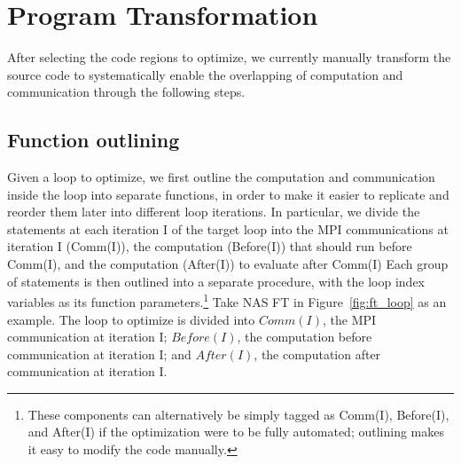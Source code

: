 \section{Program Transformation}
\label{sec-opt}

After selecting the code regions to optimize,
  we currently manually transform the source code to systematically
 enable the overlapping of computation and communication
through the following steps.

\subsection{Function outlining}
Given a loop to optimize, we
first outline the computation and communication inside the loop into separate functions,
in order to make it easier to replicate and reorder them later into different loop iterations. In particular, we divide the statements at each iteration I of the target loop into the MPI communications at iteration I (Comm(I)),
the computation  (Before(I)) that should run before Comm(I), and the computation (After(I)) to evaluate after Comm(I)
Each group of statements is then outlined into a separate procedure,  with the loop index variables as its function parameters.\footnote{These components can alternatively be simply tagged as Comm(I), Before(I), and After(I) if the optimization were to be fully automated; outlining makes it easy to modify the code manually.}
Take NAS FT in Figure~\ref{fig:ft_loop} as an example.  The loop to optimize is divided into
  $Comm(I)$, the MPI communication at iteration I;
  $Before(I)$, the computation before communication at iteration I;
  and $After(I)$, the computation after communication at iteration I.


